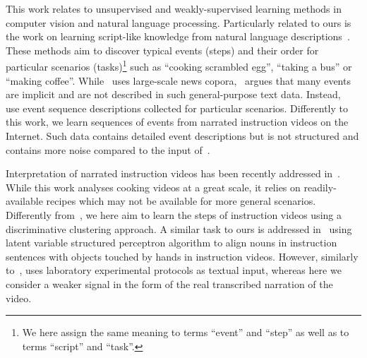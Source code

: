 \documentclass[10pt,twocolumn,letterpaper]{article}
\begin{document}
This work relates to unsupervised and weakly-supervised learning methods in computer vision and natural language processing.
Particularly related to ours is the work on learning script-like knowledge from natural language descriptions~\cite{Chambers08,Frermann14,Regneri10learning}. These methods aim to discover typical events (steps) and their order for particular scenarios (tasks)\footnote{We here assign the same meaning to terms ``event'' and ``step'' as well as to terms ``script'' and ``task''.} such as ``cooking scrambled egg'', ``taking a bus'' or ``making coffee''. While~\cite{Chambers08} uses large-scale news copora,~\cite{Regneri10learning} argues that many events are implicit and are not described in such general-purpose text data. Instead,~\cite{Frermann14,Regneri10learning} use event sequence descriptions collected for particular scenarios. Differently to this work, we learn sequences of events from narrated instruction videos on the Internet. Such data contains detailed event descriptions but is not structured and contains more noise compared to the input of~\cite{Frermann14,Regneri10learning}. 
%
%
%

Interpretation of narrated instruction videos has been recently addressed in~\cite{Malmaud15what}. While this work analyses cooking videos at a great scale, it relies on readily-available recipes which may not be available for more general scenarios. Differently from~\cite{Malmaud15what}, we here aim to learn the steps of instruction videos using a discriminative clustering approach.
A similar task to ours is addressed in~\cite{Naim15discriminative} using latent variable structured perceptron algorithm to align nouns in instruction sentences with objects touched by hands in instruction videos.
%
However, similarly to~\cite{Malmaud15what}, \cite{Naim15discriminative} uses laboratory experimental protocols as textual input, whereas here we consider a weaker signal in the form of the real transcribed narration of the video.


%
%
%
%
%
%
%
%
%
%
%
%
%
%
%
%
\end{document}
